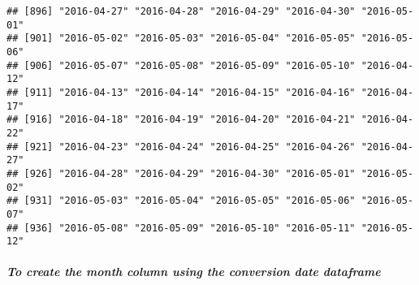 \documentclass[
]{article}
\newenvironment{Shaded}{\begin{snugshade}}{\end{snugshade}}
\newcommand{\FunctionTok}[1]{\textcolor[rgb]{0.00,0.00,0.00}{#1}}
\newcommand{\NormalTok}[1]{#1}
\newcommand{\OtherTok}[1]{\textcolor[rgb]{0.56,0.35,0.01}{#1}}
\newcommand{\SpecialCharTok}[1]{\textcolor[rgb]{0.00,0.00,0.00}{#1}}
\newcommand{\StringTok}[1]{\textcolor[rgb]{0.31,0.60,0.02}{#1}}
\begin{document}
\begin{verbatim}
## [896] "2016-04-27" "2016-04-28" "2016-04-29" "2016-04-30" "2016-05-01"
## [901] "2016-05-02" "2016-05-03" "2016-05-04" "2016-05-05" "2016-05-06"
## [906] "2016-05-07" "2016-05-08" "2016-05-09" "2016-05-10" "2016-04-12"
## [911] "2016-04-13" "2016-04-14" "2016-04-15" "2016-04-16" "2016-04-17"
## [916] "2016-04-18" "2016-04-19" "2016-04-20" "2016-04-21" "2016-04-22"
## [921] "2016-04-23" "2016-04-24" "2016-04-25" "2016-04-26" "2016-04-27"
## [926] "2016-04-28" "2016-04-29" "2016-04-30" "2016-05-01" "2016-05-02"
## [931] "2016-05-03" "2016-05-04" "2016-05-05" "2016-05-06" "2016-05-07"
## [936] "2016-05-08" "2016-05-09" "2016-05-10" "2016-05-11" "2016-05-12"
\end{verbatim}

\hypertarget{to-create-the-month-column-using-the-conversion-date-dataframe}{%
\subparagraph{To create the month column using the conversion date
dataframe}\label{to-create-the-month-column-using-the-conversion-date-dataframe}}

\begin{Shaded}
\end{Shaded}
\end{document}
